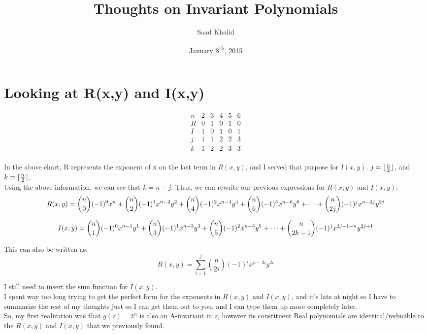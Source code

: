 \documentclass{amsart}
\DeclarePairedDelimiter{\floor}{\lfloor}{\rfloor}
\DeclarePairedDelimiter{\ceil}{\lceil}{\rceil}
\begin{document}
\title{Thoughts on Invariant Polynomials}
\author{Saad Khalid}
\date{January 8\textsuperscript{th}, 2015}
\maketitle

\section*{Looking at R(x,y) and I(x,y)}
\[
\begin{array}{c|ccccc}
	n	&	2	&	3	&	4	&	5	&	6 \\
	R	&	0	&	1	&	0	&	1	&	0\\ 
	I	&	1	&	0	&	1	&	0	&	1\\
	j	&	1	&	1	&	2	&	2	&	3\\
	k	&	1	&	2	&	2	&	3	&	3\\

\end{array}
\]

In the above chart, R represents the exponent of x on the last term in $R(x,y)$, and I served that purpose for $I(x,y)$. $j = \floor{\frac{n}{2}}$, and $k = \ceil{\frac{n}{2}}$. \\

Using the above information, we can see that $k = n - j$. Thus, we can rewrite our previous expressions for $R(x,y)$ and $I(x,y)$: \\

\[
	R(x,y) = \binom{n}{0}(-1)^0x^n + \binom{n}{2}(-1)^1x^{n-2}y^2 + \binom{n}{4}(-1)^2x^{n-4}y^4 + \binom{n}{6}(-1)^3x^{n-6}y^6 + \cdots + \space \binom{n}{2j}(-1)^jx^{n-2j}y^{2j}
\]

\[
	I(x,y) = \binom{n}{1}(-1)^0x^{n-1}y^1 + \binom{n}{3}(-1)^1x^{n-3}y^3 + \binom{n}{5}(-1)^2x^{n-5}y^5  + \cdots \space + \binom{n}{2k-1}(-1)^jx^{2j+1-n}y^{2j+1}
\]



This can also be written as:
\[
	R(x,y) = \sum_{i=1}^j \binom{n}{2i}(-1)^{i}x^{n-2i}y^{2i}
\]

I still need to insert the sum function for $I(x,y)$. \\

I spent way too long trying to get the perfect form for the exponents in $R(x,y)$ and $I(x,y)$, and it's late at night so I have to summarize the rest of my thoughts just so I can get them out to you, and I can type them up more completely later. \\
So, my first realization was that $ g(z) = \bar{z}^n$ is also an A-invariant in $z$, however its constituent Real polynomials are identical/reducible to the $R(x,y)$ and $I(x,y)$ that we previously found. \\
\end{document}
